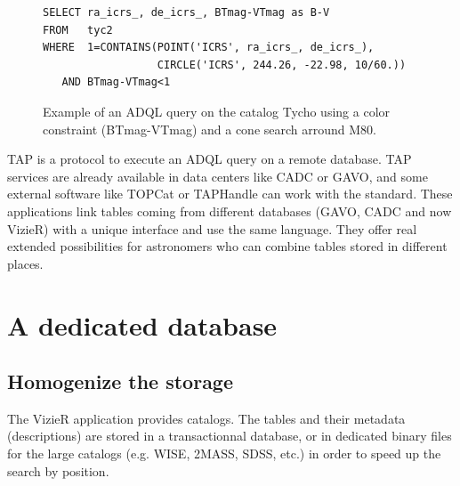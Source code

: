 \documentclass[11pt]{article}
\begin{document}
\begin{figure}[!h] \center
\begin{footnotesize}%
\begin{verbatim}
SELECT ra_icrs_, de_icrs_, BTmag-VTmag as B-V
FROM   tyc2
WHERE  1=CONTAINS(POINT('ICRS', ra_icrs_, de_icrs_),
                  CIRCLE('ICRS', 244.26, -22.98, 10/60.))
   AND BTmag-VTmag<1
\end{verbatim}\end{footnotesize}%
\caption{Example of an ADQL query on the catalog Tycho using a color 
constraint (BTmag-VTmag) and a cone search arround M80.}\label{P044:ADQLexample}
\end{figure}

TAP \citep{tap_2011} is a protocol to execute an ADQL query 
on a remote database. 
TAP services are already available in data centers like CADC or GAVO, and
some external software like TOPCat or TAPHandle can work with
the standard. These applications link tables coming from different databases
(GAVO, CADC and now VizieR) with a unique interface and use the same language.
They offer real extended possibilities for astronomers who can combine 
tables stored in different places. %


\section{A dedicated database}

\subsection{Homogenize the storage}
The VizieR application provides catalogs. The tables and their metadata (descriptions) 
are stored in a transactionnal database, or in dedicated binary files
for the large catalogs (e.g. WISE, 2MASS, SDSS, etc.) in order to speed up the 
search by position.

\end{document}
